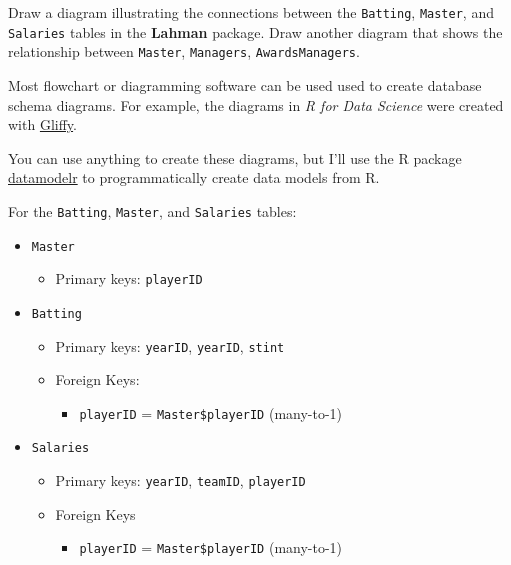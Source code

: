 \documentclass[]{book}
\providecommand{\tightlist}{%
  \setlength{\itemsep}{0pt}\setlength{\parskip}{0pt}}
\theoremstyle{plain}
\theoremstyle{remark}
\begin{document}
Draw a diagram illustrating the connections between the
\texttt{Batting}, \texttt{Master}, and \texttt{Salaries} tables in the
\textbf{Lahman} package. Draw another diagram that shows the
relationship between \texttt{Master}, \texttt{Managers},
\texttt{AwardsManagers}.

Most flowchart or diagramming software can be used used to create
database schema diagrams. For example, the diagrams in \emph{R for Data
Science} were created with \href{https://www.gliffy.com/}{Gliffy}.

You can use anything to create these diagrams, but I'll use the R
package \href{https://github.com/bergant/datamodelr}{datamodelr} to
programmatically create data models from R.

For the \texttt{Batting}, \texttt{Master}, and \texttt{Salaries} tables:

\begin{itemize}
\item
  \texttt{Master}

  \begin{itemize}
  \tightlist
  \item
    Primary keys: \texttt{playerID}
  \end{itemize}
\item
  \texttt{Batting}

  \begin{itemize}
  \item
    Primary keys: \texttt{yearID}, \texttt{yearID}, \texttt{stint}
  \item
    Foreign Keys:

    \begin{itemize}
    \tightlist
    \item
      \texttt{playerID} = \texttt{Master\$playerID} (many-to-1)
    \end{itemize}
  \end{itemize}
\item
  \texttt{Salaries}

  \begin{itemize}
  \item
    Primary keys: \texttt{yearID}, \texttt{teamID}, \texttt{playerID}
  \item
    Foreign Keys

    \begin{itemize}
    \tightlist
    \item
      \texttt{playerID} = \texttt{Master\$playerID} (many-to-1)
    \end{itemize}
  \end{itemize}
\end{itemize}
\end{document}
